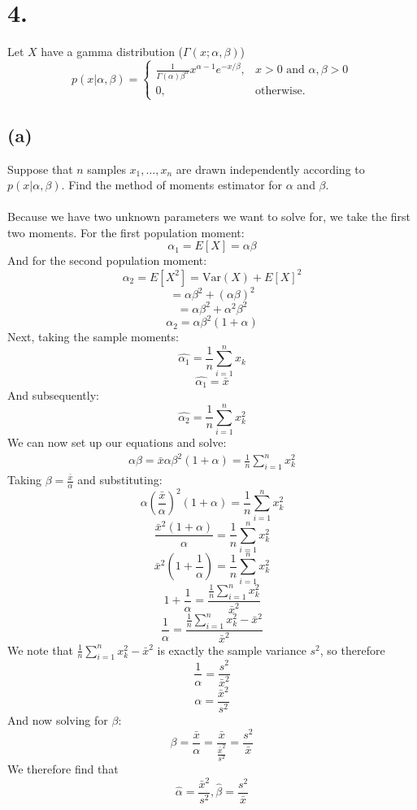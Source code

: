 \documentclass{article}
\begin{document}
{\Large 

\section*{4.}
Let \(X\) have a gamma distribution (\(\Gamma(x; \alpha, \beta)\))
\[
  p(x | \alpha, \beta) = 
  \begin{cases}
    \frac{1}{\Gamma(\alpha) \beta^\alpha} x^{\alpha - 1} e^{-x / \beta}, & x > 0 \text{ and } \alpha, \beta > 0 \\
    0, & \text{otherwise.}
  \end{cases}
\]

\subsection*{(a)} 
Suppose that \(n\) samples \(x_1, \dots, x_n\) are drawn independently according to \(p(x | \alpha, \beta)\). Find the method of moments estimator for \(\alpha\) and \(\beta\). \\ \\
Because we have two unknown parameters we want to solve for, we take the first two moments. For the first population moment:
\[
  \alpha_1 = E[X] = \alpha \beta
\]
And for the second population moment: 
\[
  \alpha_2 = E[X^2] = \text{Var}(X) + E[X]^2
\]
\[
  = \alpha \beta^2 + (\alpha \beta)^2
\]
\[
  = \alpha \beta^2 + \alpha^2 \beta^2
\]
\[
  \alpha_2 = \alpha\beta^2 (1 + \alpha)
\]
Next, taking the sample moments: 
\[
  \hat{\alpha_1} = \frac{1}{n} \sum_{i=1}^{n} x_k
\]
\[
  \hat{\alpha_1} = \bar{x}
\]
And subsequently:
\[
  \hat{\alpha_2} = \frac{1}{n} \sum_{i=1}^{n} x_k^2
\]
We can now set up our equations and solve:
\[
  \begin{aligned}
    \alpha \beta = \bar{x}
    \alpha\beta^2 (1 + \alpha) = \frac{1}{n} \sum_{i=1}^{n} x_k^2
  \end{aligned}
\]
Taking \(\beta = \frac{\bar{x}}{\alpha}\) and substituting:
\[
  \alpha (\frac{\bar{x}}{\alpha})^2 (1 + \alpha) = \frac{1}{n} \sum_{i=1}^{n} x_k^2
\]
\[
  \frac{\bar{x}^2(1 + \alpha)}{\alpha} = \frac{1}{n} \sum_{i=1}^{n} x_k^2
\]
\[
  \bar{x}^2 (1 + \frac{1}{\alpha}) = \frac{1}{n} \sum_{i=1}^{n} x_k^2
\]
\[
  1 + \frac{1}{\alpha} = \frac{\frac{1}{n} \sum_{i=1}^{n} x_k^2}{\bar{x}^2 }
\]
\[
  \frac{1}{\alpha} = \frac{\frac{1}{n} \sum_{i=1}^{n} x_k^2 - \bar{x}^2}{\bar{x}^2}
\]
We note that \(\frac{1}{n} \sum_{i=1}^{n} x_k^2 - \bar{x}^2\) is exactly the sample variance \(s^2\), so therefore 
\[
  \frac{1}{\alpha} = \frac{s^2}{\bar{x}^2}
\]
\[
  \alpha = \frac{\bar{x}^2}{s^2}
\]
And now solving for \(\beta\):
\[
  \beta = \frac{\bar{x}}{\alpha} = \frac{\bar{x}}{\frac{\bar{x}^2}{s^2}} = \frac{s^2}{\bar{x}}
\]
We therefore find that 
\[
  \boxed{\hat{\alpha} = \frac{\bar{x}^2}{s^2}, \hat{\beta} = \frac{s^2}{\bar{x}}}
\]

}
\end{document}
